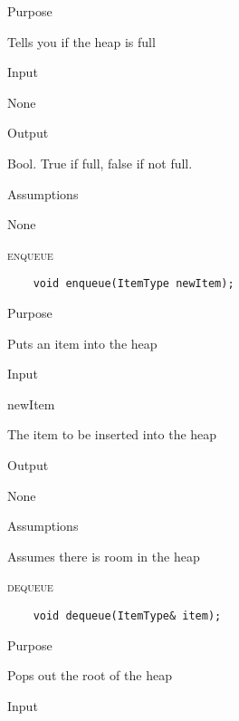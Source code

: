 \documentclass[pdftex, 12pt]{article}
\begin{document}
\begin{description}
\begin{description}
			\item{Purpose}

				Tells you if the heap is full

			\item{Input}

				None

			\item{Output}

				Bool. True if full, false if not full.

			\item{Assumptions}

				None

		\end{description}
	\item{\textsc{enqueue}}
\begin{lstlisting}
	void enqueue(ItemType newItem);
\end{lstlisting}
		\begin{description}

			\item{Purpose}

				Puts an item into the heap

			\item{Input}

				\begin{description}

					\item{newItem}

						The item to be inserted into the heap

				\end{description}

			\item{Output}

				None

			\item{Assumptions}

				Assumes there is room in the heap

		\end{description}
	\item{\textsc{dequeue}}
\begin{lstlisting}
	void dequeue(ItemType& item);
\end{lstlisting}
		\begin{description}

			\item{Purpose}

				Pops out the root of the heap

			\item{Input}


\end{description}
\end{description}
\end{document}
